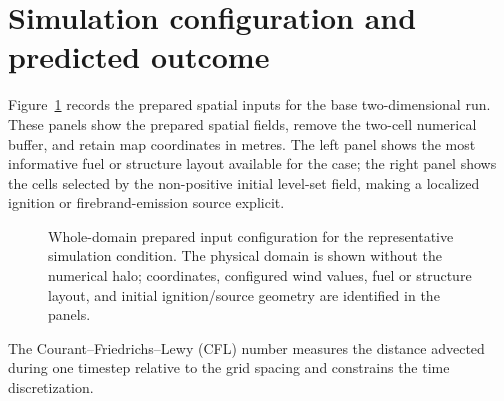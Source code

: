 \section{Simulation configuration and predicted outcome}

Figure~\ref{fig:input-configuration} records the prepared spatial inputs for the base two-dimensional run.
These panels show the prepared spatial fields, remove the
two-cell numerical buffer, and retain map coordinates in metres.  The left panel shows
the most informative fuel or structure layout available for the case; the right panel
shows the cells selected by the non-positive initial level-set field, making a localized
ignition or firebrand-emission source explicit.

\begin{figure}[H]
\centering
{}
\caption{Whole-domain prepared input configuration for the representative simulation condition.  The
physical domain is shown without the numerical halo; coordinates, configured wind values,
fuel or structure layout, and initial ignition/source geometry are identified in the panels.}
\label{fig:input-configuration}
\end{figure}

The Courant--Friedrichs--Lewy (CFL) number measures the distance
advected during one timestep relative to the grid spacing and
constrains the time discretization.

